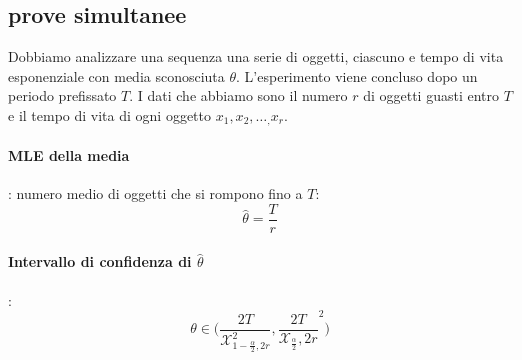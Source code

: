 \documentclass[]{article}
\begin{document}
    \subsection{prove simultanee}
    Dobbiamo analizzare una sequenza una serie di oggetti, ciascuno e tempo di vita esponenziale con media sconosciuta $\theta$. L'esperimento viene concluso dopo un periodo prefissato $T$.
    I dati che abbiamo sono il numero $r$ di oggetti guasti entro $T$ e il tempo di vita di ogni oggetto $x_1,x_2, \ldots_, x_r$.
    \paragraph{MLE della media}: numero medio di oggetti che si rompono fino a $T$:
    $$\hat{\theta} = \frac{T}{r}$$
    \paragraph{Intervallo di confidenza di $\hat{\theta}$}:
    $$ \theta \in \Big( \frac{2T}{\mathcal X_{1-\frac{\alpha}{2},2r}^2}, \frac{2T}{\mathcal X_{\frac{\alpha}{2}},2r}^2  \Big) $$
\end{document}
